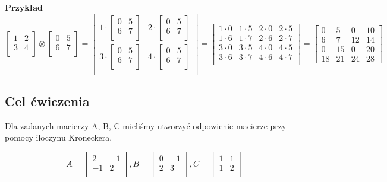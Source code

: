 		\textbf{Przykład}
	$$\begin{bmatrix}1&2\\3&4\\\end{bmatrix}\otimes {\begin{bmatrix}0&5\\6&7\\\end{bmatrix}}={\begin{bmatrix}1\cdot {\begin{bmatrix}0&5\\6&7\\\end{bmatrix}}&2\cdot {\begin{bmatrix}0&5\\6&7\\\end{bmatrix}}\\3\cdot {\begin{bmatrix}0&5\\6&7\\\end{bmatrix}}&4\cdot {\begin{bmatrix}0&5\\6&7\\\end{bmatrix}}\\\end{bmatrix}}={\begin{bmatrix}1\cdot 0&1\cdot 5&2\cdot 0&2\cdot 5\\1\cdot 6&1\cdot 7&2\cdot 6&2\cdot 7\\3\cdot 0&3\cdot 5&4\cdot 0&4\cdot 5\\3\cdot 6&3\cdot 7&4\cdot 6&4\cdot 7\\\end{bmatrix}}={\begin{bmatrix}0&5&0&10\\6&7&12&14\\0&15&0&20\\18&21&24&28\end{bmatrix}}$$
	
	\subsection{Cel ćwiczenia}
	Dla zadanych macierzy A, B, C mieliśmy utworzyć odpowienie macierze przy pomocy iloczynu Kroneckera.
	
		$$A = \begin{bmatrix}2&-1\\-1&2\\\end{bmatrix},  B = \begin{bmatrix}0&-1\\2&3\\\end{bmatrix},  C = \begin{bmatrix}1&1\\1&2\\\end{bmatrix} $$
		
